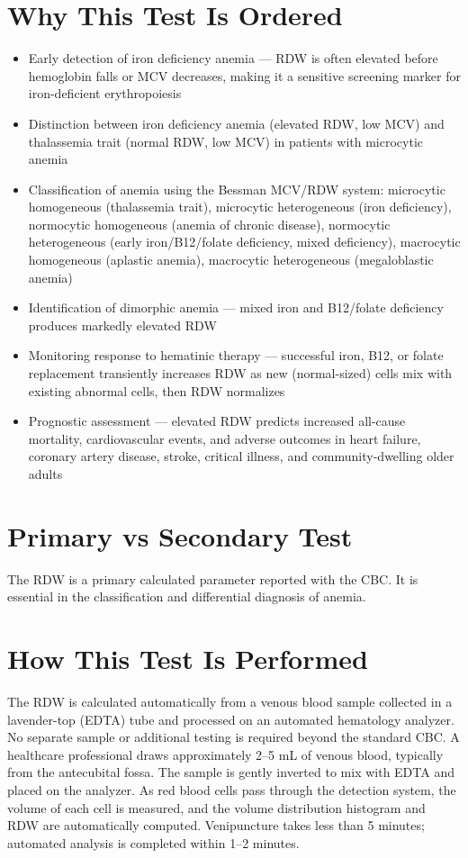 \section*{Why This Test Is Ordered}
\begin{itemize}
  \item Early detection of iron deficiency anemia --- RDW is often elevated before hemoglobin falls or MCV decreases, making it a sensitive screening marker for iron-deficient erythropoiesis
  \item Distinction between iron deficiency anemia (elevated RDW, low MCV) and thalassemia trait (normal RDW, low MCV) in patients with microcytic anemia
  \item Classification of anemia using the Bessman MCV/RDW system: microcytic homogeneous (thalassemia trait), microcytic heterogeneous (iron deficiency), normocytic homogeneous (anemia of chronic disease), normocytic heterogeneous (early iron/B12/folate deficiency, mixed deficiency), macrocytic homogeneous (aplastic anemia), macrocytic heterogeneous (megaloblastic anemia)
  \item Identification of dimorphic anemia --- mixed iron and B12/folate deficiency produces markedly elevated RDW
  \item Monitoring response to hematinic therapy --- successful iron, B12, or folate replacement transiently increases RDW as new (normal-sized) cells mix with existing abnormal cells, then RDW normalizes
  \item Prognostic assessment --- elevated RDW predicts increased all-cause mortality, cardiovascular events, and adverse outcomes in heart failure, coronary artery disease, stroke, critical illness, and community-dwelling older adults \cite{danese2015red}
\end{itemize}

\section*{Primary vs Secondary Test}
The RDW is a primary calculated parameter reported with the CBC. It is essential in the classification and differential diagnosis of anemia.

\section*{How This Test Is Performed}
The RDW is calculated automatically from a venous blood sample collected in a lavender-top (EDTA) tube and processed on an automated hematology analyzer. No separate sample or additional testing is required beyond the standard CBC. A healthcare professional draws approximately 2--5 mL of venous blood, typically from the antecubital fossa. The sample is gently inverted to mix with EDTA and placed on the analyzer. As red blood cells pass through the detection system, the volume of each cell is measured, and the volume distribution histogram and RDW are automatically computed. Venipuncture takes less than 5 minutes; automated analysis is completed within 1--2 minutes.

